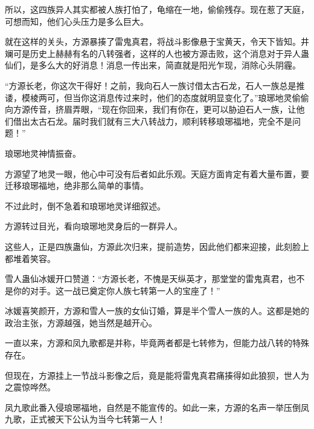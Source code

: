 \begin{this_body}
所以，这四族异人其实都被人族打怕了，龟缩在一地，偷偷残存。现在惹了天庭，可想而知，他们心头压力是多么巨大。

就在这样的关头，方源暴揍了雷鬼真君，将战斗影像悬于宝黄天，令天下皆知。井斓可是历史上赫赫有名的八转强者，这样的人也被方源击败，这个消息对于异人蛊仙们，是多么大的好消息！消息一传出来，简直就是阳光乍现，消除心头阴霾。

“方源长老，你这次干得好！之前，我向石人一族讨借太古石龙，石人一族总是推诿，模棱两可，但当你这消息传过来时，他们的态度就明显变化了。”琅琊地灵偷偷向方源传音，挤眉弄眼，“现在你回来，我们有你在，更可以胁迫石人一族，让他们借出太古石龙。届时我们就有三大八转战力，顺利转移琅琊福地，完全不是问题！”

琅琊地灵神情振奋。

方源望了地灵一眼，他心中可没有后者如此乐观。天庭方面肯定有着大量布置，要迁移琅琊福地，绝非那么简单的事情。

不过此时，倒不急着和琅琊地灵详细叙述。

方源转过目光，看向琅琊地灵身后的一群异人。

这些人，正是四族蛊仙，方源此次归来，提前造势，因此他们都来迎接，此刻脸上都堆着笑容。

雪人蛊仙冰媛开口赞道：“方源长老，不愧是天纵英才，那堂堂的雷鬼真君，也不是你的对手。这一战已奠定你人族七转第一人的宝座了！”

冰媛喜笑颜开，方源和雪人一族的女仙订婚，算是半个雪人一族的人。这都是她的政治主张，方源越强，她当然是越开心。

一直以来，方源和凤九歌都是并称，毕竟两者都是七转修为，但能力战八转的特殊存在。

但现在，方源挂上一节战斗影像之后，竟是能将雷鬼真君痛揍得如此狼狈，世人为之震惊哗然。

凤九歌此番入侵琅琊福地，自然是不能宣传的。如此一来，方源的名声一举压倒凤九歌，正式被天下公认为当今七转第一人！

\end{this_body}

